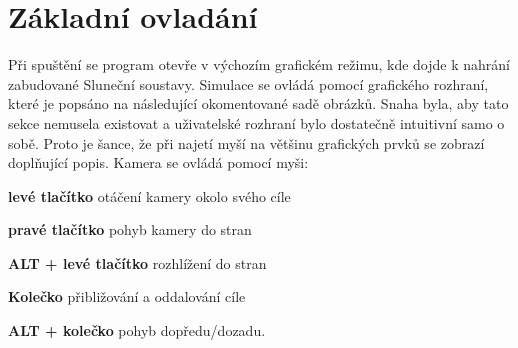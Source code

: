 \section{Základní ovladání}
Při spuštění se program otevře v výchozím grafickém režimu, kde dojde k nahrání zabudované Sluneční soustavy. Simulace se ovládá pomocí grafického rozhraní, které je popsáno na následující okomentované sadě obrázků. Snaha byla, aby tato sekce nemusela existovat a uživatelské rozhraní bylo dostatečně intuitivní samo o sobě. Proto je šance, že při najetí myší na většinu grafických prvků se zobrazí doplňující popis. Kamera se ovládá pomocí myši:
\begin{description}
	\item \textbf{levé tlačítko} otáčení kamery okolo svého cíle
	\item \textbf{pravé tlačítko} pohyb kamery do stran
	\item \textbf{ALT + levé tlačítko} rozhlížení do stran
	\item \textbf{Kolečko} přibližování a oddalování cíle
	\item \textbf{ALT + kolečko} pohyb dopředu/dozadu.
\end{description}
